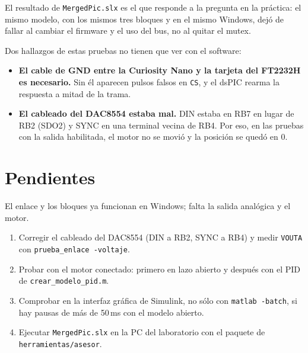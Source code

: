 \documentclass[11pt]{article}
\newcommand{\code}[1]{\texttt{#1}}
\begin{document}
El resultado de \code{MergedPic.slx} es el que responde a la pregunta en la
práctica: el mismo modelo, con los mismos tres bloques y en el mismo Windows,
dejó de fallar al cambiar el firmware y el uso del bus, no al quitar el mutex.

Dos hallazgos de estas pruebas no tienen que ver con el software:

\begin{itemize}
\item \textbf{El cable de GND entre la Curiosity Nano y la tarjeta del FT2232H
  es necesario.} Sin él aparecen pulsos falsos en \code{CS}, y el dsPIC rearma
  la respuesta a mitad de la trama.
\item \textbf{El cableado del DAC8554 estaba mal.} DIN estaba en RB7 en lugar
  de RB2 (SDO2) y SYNC en una terminal vecina de RB4. Por eso, en las pruebas
  con la salida habilitada, el motor no se movió y la posición se quedó en 0.
\end{itemize}

\section{Pendientes}

El enlace y los bloques ya funcionan en Windows; falta la salida analógica y
el motor.

\begin{enumerate}
\item Corregir el cableado del DAC8554 (DIN a RB2, SYNC a RB4) y medir
  \code{VOUTA} con \code{prueba\_enlace -voltaje}.
\item Probar con el motor conectado: primero en lazo abierto y después con el
  PID de \code{crear\_modelo\_pid.m}.
\item Comprobar en la interfaz gráfica de Simulink, no sólo con
  \code{matlab -batch}, si hay pausas de más de 50\,ms con el modelo abierto.
\item Ejecutar \code{MergedPic.slx} en la PC del laboratorio con el paquete de
  \code{herramientas/asesor}.
\end{enumerate}
\end{document}
